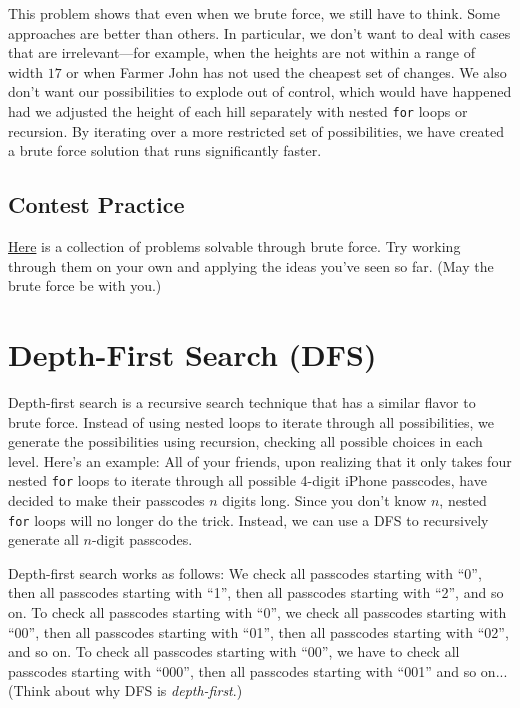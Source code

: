 This problem shows that even when we brute force, we still have to think. Some approaches are better than others. In particular, we don't want to deal with cases that are irrelevant---for example, when the heights are not within a range of width $17$ or when Farmer John has not used the cheapest set of changes. We also don't want our possibilities to explode out of control, which would have happened had we adjusted the height of each hill separately with nested \texttt{for} loops or recursion. By iterating over a more restricted set of possibilities, we have created a brute force solution that runs significantly faster.

\subsection{Contest Practice}

\href{http://codeforces.com/group/iMPx86rZXm/contest/204642}{Here} is a collection of problems solvable through brute force. Try working through them on your own and applying the ideas you've seen so far. (May the brute force be with you.)

\section{Depth-First Search (DFS)}

Depth-first search is a recursive search technique that has a similar flavor to brute force. Instead of using nested loops to iterate through all possibilities, we generate the possibilities using recursion, checking all possible choices in each level. Here's an example: All of your friends, upon realizing that it only takes four nested \texttt{for} loops to iterate through all possible 4-digit iPhone passcodes, have decided to make their passcodes $n$ digits long. Since you don't know $n$, nested \texttt{for} loops will no longer do the trick. Instead, we can use a DFS to recursively generate all $n$-digit passcodes.

Depth-first search works as follows: We check all passcodes starting with ``0'', then all passcodes starting with ``1'', then all passcodes starting with ``2'', and so on. To check all passcodes starting with ``0'', we check all passcodes starting with ``00'', then all passcodes starting with ``01'', then all passcodes starting with ``02'', and so on. To check all passcodes starting with ``00'', we have to check all passcodes starting with ``000'', then all passcodes starting with ``001'' and so on... (Think about why DFS is \emph{depth-first}.)

